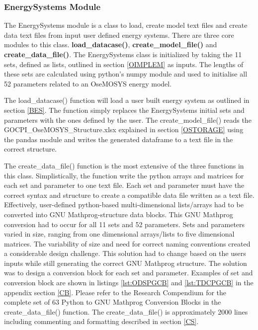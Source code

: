 \documentclass[12pt]{article}
\begin{document}
\subsubsection{EnergySystems Module} \label{ESM}
The EnergySystems module is a class to load, create model text files and create data text files from input user defined energy systems. 
There are three core modules to this class. \textbf{load\_datacase()}, \textbf{create\_model\_file()} and \textbf{create\_data\_file()}.
The EnergySystems class is initialized by taking the 11 sets, defined as lists, outlined in section \ref{OIMPLEM} as inputs. 
The lengths of these sets are calculated using python's numpy module and used to initialise all 52 parameters related to an OseMOSYS energy model.

The load\_datacase() function will load a user built energy system as outlined in section \ref{BES}. 
The function simply replaces the EnergySystems initial sets and parameters with the ones defined by the user.
The create\_model\_file() reads the GOCPI\_OseMOSYS\_Structure.xlsx explained in section \ref{OSTORAGE} using the pandas module and writes the generated dataframe to a text file in the correct structure.

The create\_data\_file() function is the most extensive of the three functions in this class.
Simplistically, the function write the python arrays and matrices for each set and parameter to one text file.
Each set and parameter must have the correct syntax and structure to create a compatible data file written as a text file.
Effectively, user-defined python-based multi-dimensional lists/arrays had to be converted into GNU Mathprog-structure data blocks.
This GNU Mathprog conversion had to occur for all 11 sets and 52 parameters.
Sets and parameters varied in size, ranging from one dimensional arrays/lists to five dimensional matrices.
The variability of size and need for correct naming conventions created a considerable design challenge.
This solution had to change based on the users inputs while still generating the correct GNU Mathprog structure.
The solution was to design a conversion block for each set and parameter. 
Examples of set and conversion block are shown in listings \ref{lst:ODSPGCB} and \ref{lst:TDCPGCB} in the appendix section \ref{CB}.
Please refer to the Research Compendium for the complete set of 63 Python to GNU Mathprog Conversion Blocks in the create\_data\_file() function.
The create\_data\_file() is approximately 2000 lines including commenting and formatting described in section \ref{CS}.
\end{document}

